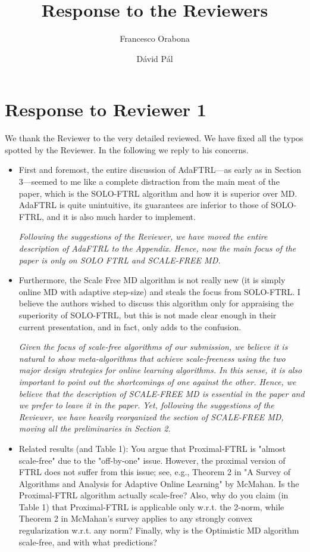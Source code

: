 \documentclass{article}
\author{Francesco Orabona
\and
D\'avid P\'al}
\title{Response to the Reviewers}
\begin{document}
\maketitle

\section{Response to Reviewer 1} 

We thank the Reviewer to the very detailed reviewed. We have fixed all the typos spotted by the Reviewer. In the following we reply to his concerns.

\begin{itemize}
\item First and foremost, the entire discussion of AdaFTRL---as early as in Section 3---seemed to me like a complete distraction from the main meat of the paper, which is the SOLO-FTRL algorithm and how it is superior over MD.  AdaFTRL is quite unintuitive, its guarantees are inferior to those of SOLO-FTRL, and it is also much harder to implement.

\emph{Following the suggestions of the Reviewer, we have moved the entire description of AdaFTRL to the Appendix. Hence, now the main focus of the paper is only on SOLO FTRL and SCALE-FREE MD.}

\item Furthermore, the Scale Free MD algorithm is not really new (it is simply online MD with adaptive step-size) and steals the focus from SOLO-FTRL.  I believe the authors wished to discuss this algorithm only for appraising the superiority of SOLO-FTRL, but this is not made clear enough in their current presentation, and in fact, only adds to the confusion.

\emph{Given the focus of scale-free algorithms of our submission, we believe it is natural to show meta-algorithms that achieve scale-freeness using the two major design strategies for online learning algorithms. In this sense, it is also important to point out the shortcomings of one against the other. Hence, we believe that the description of SCALE-FREE MD is essential in the paper and we prefer to leave it in the paper. Yet, following the suggestions of the Reviewer, we have heavily reorganized the section of SCALE-FREE MD, moving all the preliminaries in Section 2.}

\item Related results (and Table 1): You argue that Proximal-FTRL is "almost
scale-free" due to the "off-by-one" issue.  However, the proximal version of
FTRL does not suffer from this issue; see, e.g., Theorem 2 in "A Survey of
Algorithms and Analysis for Adaptive Online Learning" by McMahan.  Is the
Proximal-FTRL algorithm actually scale-free?  Also, why do you claim (in Table
1) that Proximal-FTRL is applicable only w.r.t. the 2-norm, while Theorem 2 in
McMahan's survey applies to any strongly convex regularization w.r.t. any norm?
Finally, why is the Optimistic MD algorithm scale-free, and with what
predictions?


\end{itemize}
\end{document}
